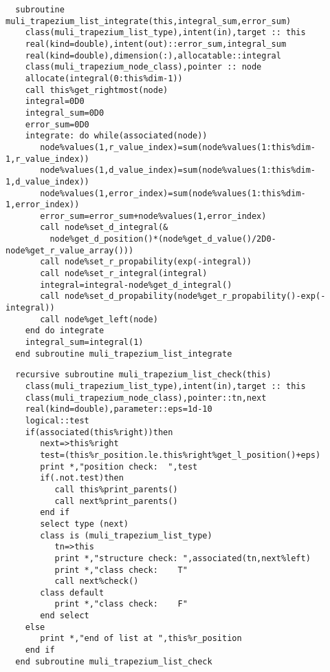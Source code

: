 \begin{Verbatim}
  subroutine muli_trapezium_list_integrate(this,integral_sum,error_sum)
    class(muli_trapezium_list_type),intent(in),target :: this
    real(kind=double),intent(out)::error_sum,integral_sum
    real(kind=double),dimension(:),allocatable::integral
    class(muli_trapezium_node_class),pointer :: node
    allocate(integral(0:this%dim-1))
    call this%get_rightmost(node)
    integral=0D0
    integral_sum=0D0
    error_sum=0D0
    integrate: do while(associated(node))
       node%values(1,r_value_index)=sum(node%values(1:this%dim-1,r_value_index))
       node%values(1,d_value_index)=sum(node%values(1:this%dim-1,d_value_index))
       node%values(1,error_index)=sum(node%values(1:this%dim-1,error_index))
       error_sum=error_sum+node%values(1,error_index)
       call node%set_d_integral(&
         node%get_d_position()*(node%get_d_value()/2D0-node%get_r_value_array()))
       call node%set_r_propability(exp(-integral))
       call node%set_r_integral(integral)
       integral=integral-node%get_d_integral()
       call node%set_d_propability(node%get_r_propability()-exp(-integral))
       call node%get_left(node)
    end do integrate
    integral_sum=integral(1)
  end subroutine muli_trapezium_list_integrate
\end{Verbatim}

\begin{Verbatim}
  recursive subroutine muli_trapezium_list_check(this)
    class(muli_trapezium_list_type),intent(in),target :: this
    class(muli_trapezium_node_class),pointer::tn,next
    real(kind=double),parameter::eps=1d-10
    logical::test
    if(associated(this%right))then
       next=>this%right
       test=(this%r_position.le.this%right%get_l_position()+eps)
       print *,"position check:  ",test
       if(.not.test)then
          call this%print_parents()
          call next%print_parents()
       end if
       select type (next)
       class is (muli_trapezium_list_type)
          tn=>this
          print *,"structure check: ",associated(tn,next%left)
          print *,"class check:    T"
          call next%check()
       class default
          print *,"class check:    F"
       end select
    else
       print *,"end of list at ",this%r_position
    end if
  end subroutine muli_trapezium_list_check
\end{Verbatim}

